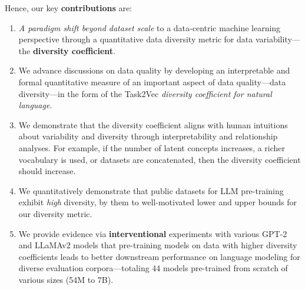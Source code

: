 Hence, our key \textbf{contributions} are:
\begin{enumerate}
    \item \textit{A paradigm shift beyond dataset scale} to a data-centric machine learning perspective through a quantitative data diversity metric for data variability---the \textbf{diversity coefficient}.
    \item We advance discussions on data quality by developing an interpretable and formal quantitative measure of an important aspect of data quality---data diversity---in the form of the Task2Vec \textit{diversity coefficient for natural language}.
    \item We demonstrate that the diversity coefficient aligns with human intuitions about variability and diversity through interpretability and relationship analyses.
    For example, if 
    the number of latent concepts increases, a richer vocabulary is used, or datasets are concatenated, then the diversity coefficient should increase.
    \item We quantitatively demonstrate that public datasets for LLM pre-training exhibit \textit{high} diversity, by them to well-motivated lower and upper bounds for our diversity metric.
    \item We provide evidence via \textbf{interventional} experiments with various GPT-2 and LLaMAv2 models that pre-training models on data with higher diversity coefficients leads to better downstream performance on language modeling for diverse evaluation corpora---totaling 44 models pre-trained from scratch of various sizes (54M  to 7B).
\end{enumerate}

